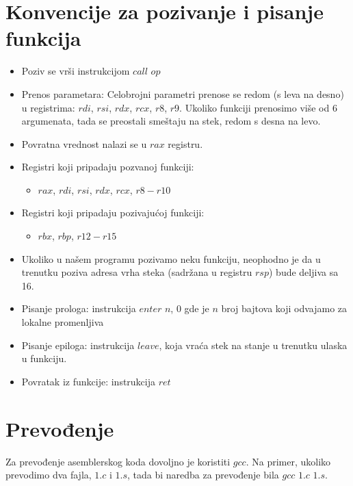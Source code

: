 \documentclass[a4paper, 10pt]{article}
\begin{document}
\section{Konvencije za pozivanje i pisanje funkcija}
\begin{itemize}
\item Poziv se vrši instrukcijom $call$ $op$
	\item Prenos parametara: Celobrojni parametri prenose se redom (s leva na desno) u registrima: $rdi$, $rsi$, $rdx$, $rcx$, $r8$, $r9$. Ukoliko funkciji prenosimo više od 6 argumenata, tada se preostali smeštaju na stek, redom s desna na levo.
	\item Povratna vrednost nalazi se u $rax$ registru.
	\item Registri koji pripadaju pozvanoj funkciji:
		\begin{itemize}
			\item $rax$, $rdi$, $rsi$, $rdx$, $rcx$, $r8-r10$
		\end{itemize}
	\item Registri koji pripadaju pozivajućoj funkciji:
		\begin{itemize}
			\item $rbx$, $rbp$, $r12-r15$
		\end{itemize}
	\item Ukoliko u našem programu pozivamo neku funkciju, neophodno je da u trenutku poziva adresa vrha steka (sadržana u registru $rsp$) bude deljiva sa 16.
	\item Pisanje prologa: instrukcija $enter$ $n$, $0$ gde je $n$ broj bajtova koji odvajamo za lokalne promenljiva
	\item Pisanje epiloga: instrukcija $leave$, koja vraća stek na stanje u trenutku ulaska u funkciju.
	\item Povratak iz funkcije: instrukcija $ret$
\end{itemize}
	
\section{Prevođenje}
Za prevođenje asemblerskog koda dovoljno je koristiti $gcc$. Na primer, ukoliko prevodimo dva fajla, $1.c$ i $1.s$, tada bi naredba za prevođenje bila $gcc$ $1.c$ $1.s$.
\end{document}
